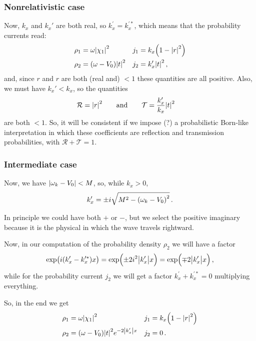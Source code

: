 \documentclass[main.tex]{subfiles}
\begin{document}
\subsubsection{Nonrelativistic case}

Now, \(k_x\) and \(k_x'\) are both real, so \(k_x^{\prime } = k_x^{\prime *}\), which means that the probability currents read: 
%
\begin{subequations}
\begin{align}
\rho_1 &= \omega \abs{\chi_1 }^2
&
j_1 &= k_x \qty(1 - \abs{r}^2) \\
\rho_2 &= (\omega - V_0 ) \abs{t}^2 
&
j_2 &=  k_x^{\prime } \abs{t}^2 
\,,
\end{align}
\end{subequations}
%
and, since \(r\) and \(r\) are both (real and) \(<1\) these quantities are all positive. Also, we must have \(k_x' < k_x\), so the quantities 
%
\begin{align}
\mathcal{R} &= \abs{r}^2
\qquad \text{and} \qquad
\mathcal{T} = \frac{k_x'}{k_x} \abs{t}^2
\,
\end{align}
%
are both \(<1\). So, it will be consistent if we impose (?) a probabilistic Born-like interpretation in which these coefficients are reflection and transmission probabilities, with \(\mathcal{R} + \mathcal{T} = 1\).

\subsubsection{Intermediate case}

Now, we have \(\abs{\omega_{k} - V_0 } < M\), so, while \(k_x>0\), 
%
\begin{align}
k_x' = \pm i \sqrt{M^2 - \qty(\omega_{k} - V_0 )^2}
\,.
\end{align}

In principle we could have both \(+\) or \(-\), but we select the positive imaginary because it is the physical in which the wave travels rightward. 

Now, in our computation of the probability density \(\rho_2 \) we will have a factor 
%
\begin{align}
\exp(i (k_x' - k_x^{\prime *})x) = \exp(\pm 2 i^2 \abs{k_x'}x) =  \exp(\mp 2 \abs{k_x^{\prime }} x)
\,,
\end{align}
%
while for the probability current \(j_2 \) we will get a factor \(k_x^{\prime } + k_x^{\prime *} = 0 \) multiplying everything.

So, in the end we get 
%
\begin{subequations}
\begin{align}
\rho_1 &= \omega \abs{\chi_1 }^2
&
j_1 &= k_x \qty(1 - \abs{r}^2) \\
\rho_2 &= (\omega - V_0 ) \abs{t}^2 e^{-2 \abs{k_x^{\prime }} x}
&
j_2 &= 0 
\,.
\end{align}
\end{subequations}
\end{document}
